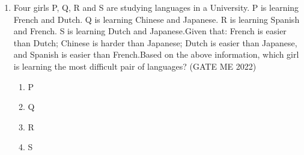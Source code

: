 \documentclass[journal]{IEEEtran}
\numberwithin{equation}{enumi}
\numberwithin{figure}{enumi}
\begin{document}
\begin{enumerate}
\begin{multicols}{4}
\begin{enumerate}
        \item 37.25
        \item 43.75
        \item 50.00
    \end{enumerate}
\end{multicols}
 \item Four girls P, Q, R and S are studying languages in a University. P is learning French and Dutch. Q is learning Chinese and Japanese. R is learning Spanish and French. S is learning Dutch and Japanese.Given that: French is easier than Dutch; Chinese is harder than Japanese; Dutch is easier than Japanese, and Spanish is easier than French.Based on the above information, which girl is learning the most difficult pair of languages?
 \hfill{(GATE ME 2022)}
\begin{multicols}{4}
    \begin{enumerate}
        \item P
        \item Q
        \item  R
        \item  S
    \end{enumerate}
\end{multicols}


\end{enumerate}
\end{document}
